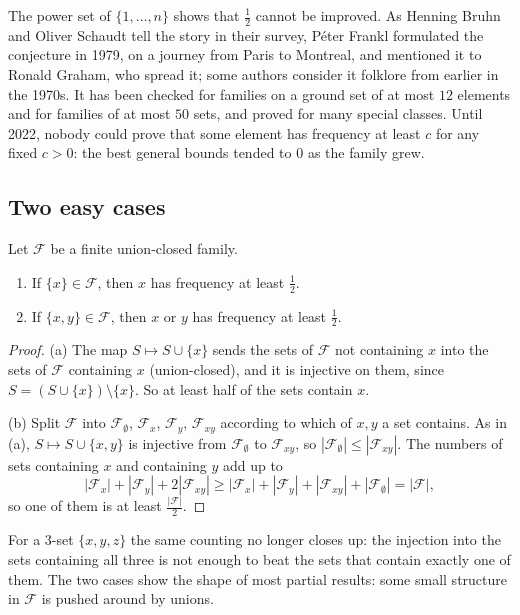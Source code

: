 The power set of $\{1,\dots,n\}$ shows that $\frac12$ cannot be improved. As Henning Bruhn and Oliver Schaudt tell the story in their survey, P\'eter
Frankl formulated the conjecture in 1979, on a journey from Paris to Montreal, and mentioned it to Ronald Graham, who spread it; some authors consider it
folklore from earlier in the 1970s. It has been checked for families on a ground set of at most $12$ elements and for families of at most $50$ sets, and
proved for many special classes. Until 2022, nobody could prove that some element has frequency at least $c$ for any fixed $c>0$: the best general
bounds tended to $0$ as the family grew.

\subsection{Two easy cases}

\begin{proposition}\label{prop:ucsmall}
Let $\mathcal F$ be a finite union-closed family.
\begin{enumerate}[label=(\alph*)]
\item If $\{x\}\in\mathcal F$, then $x$ has frequency at least $\frac12$.
\item If $\{x,y\}\in\mathcal F$, then $x$ or $y$ has frequency at least $\frac12$.
\end{enumerate}
\end{proposition}
\begin{proof}
(a) The map $S\mapsto S\cup\{x\}$ sends the sets of $\mathcal F$ not containing $x$ into the sets of $\mathcal F$ containing $x$ (union-closed), and it is
injective on them, since $S=(S\cup\{x\})\setminus\{x\}$. So at least half of the sets contain $x$.

(b) Split $\mathcal F$ into $\mathcal F_\emptyset$, $\mathcal F_x$, $\mathcal F_y$, $\mathcal F_{xy}$ according to which of $x,y$ a set contains. As in (a),
$S\mapsto S\cup\{x,y\}$ is injective from $\mathcal F_\emptyset$ to $\mathcal F_{xy}$, so $|\mathcal F_\emptyset|\le|\mathcal F_{xy}|$. The numbers of sets
containing $x$ and containing $y$ add up to
\[
|\mathcal F_x|+|\mathcal F_y|+2|\mathcal F_{xy}|\ge|\mathcal F_x|+|\mathcal F_y|+|\mathcal F_{xy}|+|\mathcal F_\emptyset|=|\mathcal F|,
\]
so one of them is at least $\frac{|\mathcal F|}2$.
\end{proof}

For a $3$-set $\{x,y,z\}$ the same counting no longer closes up: the injection into the sets containing all three is not enough to beat the
sets that contain exactly one of them. The two cases show the shape of most partial results: some small structure in $\mathcal F$ is pushed around by unions.


